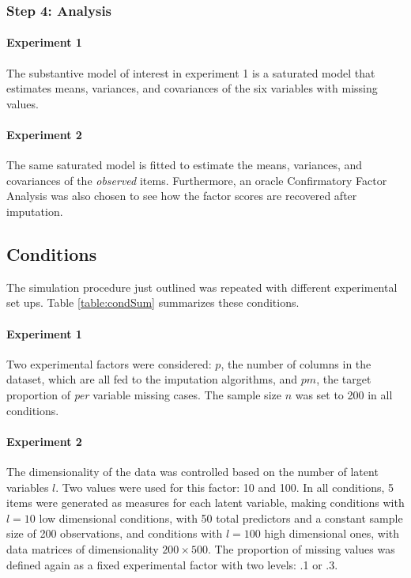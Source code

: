 \subsubsection{Step 4: Analysis}
	
	\paragraph{Experiment 1}
	The substantive model of interest in experiment 1 is a saturated model that estimates means,
	variances, and covariances of the six variables with missing values.

	\paragraph{Experiment 2}
	The same saturated model is fitted to estimate the means, variances, and covariances of the 
	\emph{observed} items.
	Furthermore, an oracle Confirmatory Factor Analysis was also chosen to see how the factor scores 
	are recovered after imputation.

\subsection{Conditions}
	
	The simulation procedure just outlined was repeated with different experimental set ups. 
	Table \ref{table:condSum} summarizes these conditions.

	\paragraph{Experiment 1}
	Two experimental factors were considered: $p$, the number of columns in the dataset, which 
	are all fed to the imputation algorithms, and $pm$, the target proportion of \emph{per} variable missing cases.
	The sample size $n$ was set to 200 in all conditions.

	\paragraph{Experiment 2}
	The dimensionality of the data was controlled based on the number of latent variables $l$.
	Two values were used for this factor: 10 and 100. 
	In all conditions, 5 items were generated as measures for each latent variable, making conditions with $l = 10$ 
	low dimensional conditions, with 50 total predictors and a constant sample size of 200 observations, and 
	conditions with $l = 100$ high dimensional ones, with data matrices of dimensionality $200 \times 500$.
	The proportion of missing values was defined again as a fixed experimental factor with two levels: .1 or .3.

